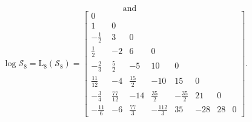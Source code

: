 \begin{example}
\begin{displaymath}
\quad\text{and}
\end{displaymath}
\begin{displaymath}
\log{\mathcal{S}_{8}} = \operatorname{L_{ 8 }}{\left (\mathcal{S}_{ 8 } \right )} = \left[\begin{matrix}0 &  &  &  &  &  &  & \\1 & 0  &  &  &  &  &  & \\- \frac{1}{2} & 3 & 0 &  &  &  &  & \\\frac{1}{2} & -2 & 6 & 0 &  &  &  & \\- \frac{2}{3} & \frac{5}{2} & -5 & 10 & 0 &  &  & \\\frac{11}{12} & -4 & \frac{15}{2} & -10 & 15 & 0 &  & \\- \frac{3}{4} & \frac{77}{12} & -14 & \frac{35}{2} & - \frac{35}{2} & 21 & 0 & \\- \frac{11}{6} & -6 & \frac{77}{3} & - \frac{112}{3} & 35 & -28 & 28 & 0 \end{matrix}\right].
\end{displaymath}
\end{example}
